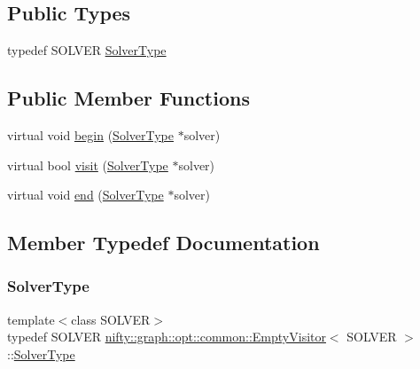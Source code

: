 \subsection*{Public Types}
\begin{DoxyCompactItemize}
\item 
typedef S\+O\+L\+V\+ER \hyperlink{classnifty_1_1graph_1_1opt_1_1common_1_1EmptyVisitor_ab26fb53154e7dab11e8768c7f7cd7eea}{Solver\+Type}
\end{DoxyCompactItemize}
\subsection*{Public Member Functions}
\begin{DoxyCompactItemize}
\item 
virtual void \hyperlink{classnifty_1_1graph_1_1opt_1_1common_1_1EmptyVisitor_a5f9827674a0f59ada6b10a468efe85e8}{begin} (\hyperlink{classnifty_1_1graph_1_1opt_1_1common_1_1VisitorBase_a433d03139897d4aefe27315b2bbb3adc}{Solver\+Type} $\ast$solver)
\item 
virtual bool \hyperlink{classnifty_1_1graph_1_1opt_1_1common_1_1EmptyVisitor_a709039dcb9c0d178ba45a7182c58388d}{visit} (\hyperlink{classnifty_1_1graph_1_1opt_1_1common_1_1VisitorBase_a433d03139897d4aefe27315b2bbb3adc}{Solver\+Type} $\ast$solver)
\item 
virtual void \hyperlink{classnifty_1_1graph_1_1opt_1_1common_1_1EmptyVisitor_a08d9fee2b6eb515bbec2c2ff46d2d0f4}{end} (\hyperlink{classnifty_1_1graph_1_1opt_1_1common_1_1VisitorBase_a433d03139897d4aefe27315b2bbb3adc}{Solver\+Type} $\ast$solver)
\end{DoxyCompactItemize}


\subsection{Member Typedef Documentation}
\mbox{\label{classnifty_1_1graph_1_1opt_1_1common_1_1EmptyVisitor_ab26fb53154e7dab11e8768c7f7cd7eea}} 
\subsubsection{\texorpdfstring{Solver\+Type}{SolverType}}
{\footnotesize\ttfamily template$<$class S\+O\+L\+V\+ER$>$ \\
typedef S\+O\+L\+V\+ER \hyperlink{classnifty_1_1graph_1_1opt_1_1common_1_1EmptyVisitor}{nifty\+::graph\+::opt\+::common\+::\+Empty\+Visitor}$<$ S\+O\+L\+V\+ER $>$\+::\hyperlink{classnifty_1_1graph_1_1opt_1_1common_1_1VisitorBase_a433d03139897d4aefe27315b2bbb3adc}{Solver\+Type}}



